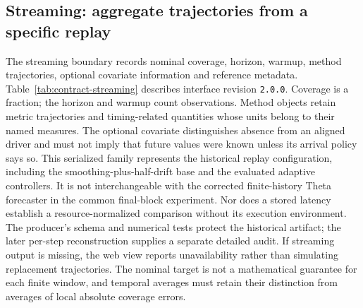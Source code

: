 \subsection{Streaming: aggregate trajectories from a specific replay}
\label{sec:contract-streaming}
The streaming boundary records nominal coverage, horizon, warmup, method trajectories, optional covariate information and reference metadata. Table~\ref{tab:contract-streaming} describes interface revision \texttt{2.0.0}. Coverage is a fraction; the horizon and warmup count observations. Method objects retain metric trajectories and timing-related quantities whose units belong to their named measures. The optional covariate distinguishes absence from an aligned driver and must not imply that future values were known unless its arrival policy says so. This serialized family represents the historical replay configuration, including the smoothing-plus-half-drift base and the evaluated adaptive controllers. It is not interchangeable with the corrected finite-history Theta forecaster in the common final-block experiment. Nor does a stored latency establish a resource-normalized comparison without its execution environment. The producer's schema and numerical tests protect the historical artifact; the later per-step reconstruction supplies a separate detailed audit. If streaming output is missing, the web view reports unavailability rather than simulating replacement trajectories. The nominal target is not a mathematical guarantee for each finite window, and temporal averages must retain their distinction from averages of local absolute coverage errors.


